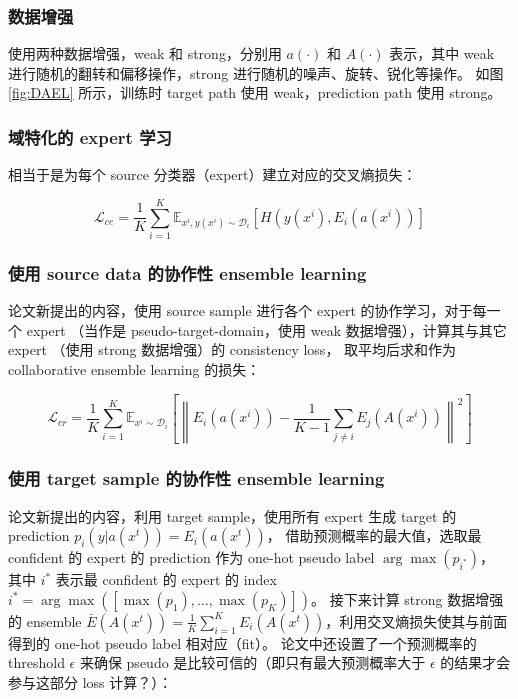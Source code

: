 \documentclass[UTF8]{ctexart}
\begin{document}
\subsubsection{数据增强}

使用两种数据增强，weak 和 strong，分别用 $a(\cdot)$ 和 $A(\cdot)$ 表示，其中 weak 进行随机的翻转和偏移操作，strong 进行随机的噪声、旋转、锐化等操作。
如图 \ref{fig:DAEL} 所示，训练时 target path 使用 weak，prediction path 使用 strong。

\subsubsection{域特化的 expert 学习}

相当于是为每个 source 分类器（expert）建立对应的交叉熵损失：

$$
\mathcal{L}_{ce}=\frac{1}{K} \sum_{i=1}^{K} \mathbb{E}_{x^{i}, y\left(x^{i}\right) \sim \mathcal{D}_{i}}\left[H\left(y\left(x^{i}\right), E_{i}\left(a\left(x^{i}\right)\right)\right]\right.
$$

\subsubsection{使用 source data 的协作性 ensemble learning}

论文新提出的内容，使用 source sample 进行各个 expert 的协作学习，对于每一个 expert （当作是 pseudo-target-domain，使用 weak 数据增强），计算其与其它 expert （使用 strong 数据增强）的 consistency loss，
取平均后求和作为 collaborative ensemble learning 的损失：

$$
\mathcal{L}_{cr}=\frac{1}{K} \sum_{i=1}^{K} \mathbb{E}_{x^{i} \sim \mathcal{D}_{i}}\left[\left\|E_{i}\left(a\left(x^{i}\right)\right)-\frac{1}{K-1} \sum_{j \neq i} E_{j}\left(A\left(x^{i}\right)\right)\right\|^{2}\right]
$$

\subsubsection{使用 target sample 的协作性 ensemble learning}

论文新提出的内容，利用 target sample，使用所有 expert 生成 target 的 prediction $p_{i}(y|a(x^{t}))=E_{i}(a(x^{t}))$，
借助预测概率的最大值，选取最 confident 的 expert 的 prediction 作为 one-hot pseudo label $\arg \max (p_{i^{*}})$，
其中 $i^*$ 表示最 confident 的 expert 的 index $i^{*}=\arg \max ([\max(p_{1}), \ldots, \max(p_{K})])$。
接下来计算 strong 数据增强的 ensemble $\bar{E}(A(x^{t}))=\frac{1}{K} \sum_{i=1}^{K} E_{i}(A(x^{t}))$，利用交叉熵损失使其与前面得到的 one-hot pseudo label 相对应（fit）。
论文中还设置了一个预测概率的 threshold $\epsilon$ 来确保 pseudo 是比较可信的（即只有最大预测概率大于 $\epsilon$ 的结果才会参与这部分 loss 计算？）：
\end{document}
